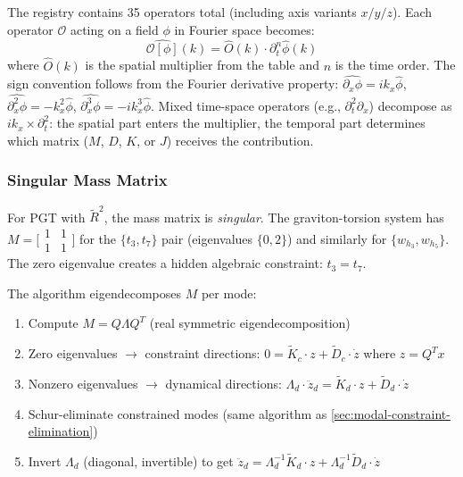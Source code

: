 The registry contains 35 operators total (including axis variants $x/y/z$).  Each operator $\mathcal{O}$ acting on a field $\phi$ in Fourier space becomes:
\begin{equation}
  \widehat{\mathcal{O}[\phi]}(k) = \hat{O}(k) \cdot \partial_t^n \hat{\phi}(k)
\end{equation}
where $\hat{O}(k)$ is the spatial multiplier from the table and $n$ is the time order.  The sign convention follows from the Fourier derivative property: $\widehat{\partial_x \phi} = ik_x \hat\phi$, $\widehat{\partial_x^2 \phi} = -k_x^2 \hat\phi$, $\widehat{\partial_x^3 \phi} = -ik_x^3 \hat\phi$.  Mixed time-space operators (e.g., $\partial_t^2 \partial_x$) decompose as $ik_x \times \partial_t^2$: the spatial part enters the multiplier, the temporal part determines which matrix ($M$, $D$, $K$, or $J$) receives the contribution.

\subsubsection{Singular Mass Matrix}
\label{sec:modal-singular-mass}

For PGT with $\tilde{R}^2$, the mass matrix is \emph{singular}. The graviton-torsion system has $M = \bigl[\begin{smallmatrix} 1 & 1 \\ 1 & 1 \end{smallmatrix}\bigr]$ for the $\{t_3, t_7\}$ pair (eigenvalues $\{0, 2\}$) and similarly for $\{w_{h_3}, w_{h_5}\}$. The zero eigenvalue creates a hidden algebraic constraint: $t_3 = t_7$.

The algorithm eigendecomposes $M$ per mode:
\begin{enumerate}
  \item Compute $M = Q \Lambda Q^T$ (real symmetric eigendecomposition)
  \item Zero eigenvalues $\to$ constraint directions: $0 = \tilde{K}_c \cdot z + \tilde{D}_c \cdot \dot{z}$ where $z = Q^T x$
  \item Nonzero eigenvalues $\to$ dynamical directions: $\Lambda_d \cdot \ddot{z}_d = \tilde{K}_d \cdot z + \tilde{D}_d \cdot \dot{z}$
  \item Schur-eliminate constrained modes (same algorithm as \cref{sec:modal-constraint-elimination})
  \item Invert $\Lambda_d$ (diagonal, invertible) to get $\ddot{z}_d = \Lambda_d^{-1} \tilde{K}_d \cdot z + \Lambda_d^{-1} \tilde{D}_d \cdot \dot{z}$
\end{enumerate}

